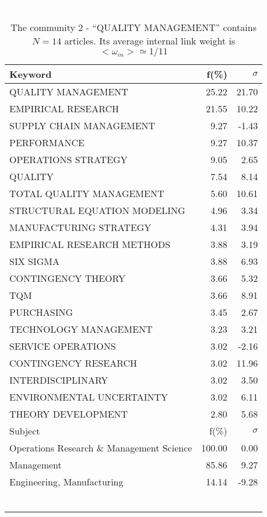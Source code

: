 \documentclass[a4paper,11pt]{report}
\begin{document}
\begin{landscape}
\clearpage

\begin{table}[!ht]
\caption{The community 2 - ``QUALITY MANAGEMENT'' contains $N = 14$ articles. Its average internal link weight is $<\omega_{in}> \simeq 1/11$ }
\textcolor{white}{aa}\\
{\scriptsize\begin{tabular}{|l r r|}
\hline
Keyword & f(\%) & $\sigma$\\
\hline
QUALITY MANAGEMENT & 25.22 & 21.70\\
EMPIRICAL RESEARCH & 21.55 & 10.22\\
SUPPLY CHAIN MANAGEMENT & 9.27 & -1.43\\
PERFORMANCE & 9.27 & 10.37\\
OPERATIONS STRATEGY & 9.05 & 2.65\\
QUALITY & 7.54 & 8.14\\
TOTAL QUALITY MANAGEMENT & 5.60 & 10.61\\
STRUCTURAL EQUATION MODELING & 4.96 & 3.34\\
MANUFACTURING STRATEGY & 4.31 & 3.94\\
EMPIRICAL RESEARCH METHODS & 3.88 & 3.19\\
SIX SIGMA & 3.88 & 6.93\\
CONTINGENCY THEORY & 3.66 & 5.32\\
TQM & 3.66 & 8.91\\
PURCHASING & 3.45 & 2.67\\
TECHNOLOGY MANAGEMENT & 3.23 & 3.21\\
SERVICE OPERATIONS & 3.02 & -2.16\\
CONTINGENCY RESEARCH & 3.02 & 11.96\\
INTERDISCIPLINARY & 3.02 & 3.50\\
ENVIRONMENTAL UNCERTAINTY & 3.02 & 6.11\\
THEORY DEVELOPMENT & 2.80 & 5.68\\
\hline
\hline
Subject & f(\%) & $\sigma$\\
\hline
Operations Research \& Management Science & 100.00 & 0.00\\
Management & 85.86 & 9.27\\
Engineering, Manufacturing & 14.14 & -9.28\\
 &  & \\
 &  & \\
 &  & \\
 &  & \\
 &  & \\
 &  & \\

\end{tabular}}
\end{table}
\end{landscape}
\end{document}
